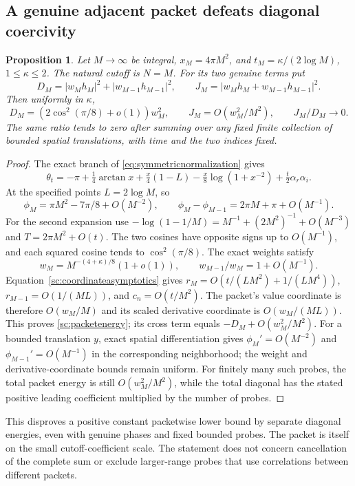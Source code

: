 \documentclass[11pt]{article}
\numberwithin{equation}{section}
\newtheorem{proposition}[theorem]{Proposition}
\theoremstyle{definition}
\theoremstyle{remark}
\begin{document}
\subsection{A genuine adjacent packet defeats diagonal coercivity}
\begin{proposition}\label{sc:packet}
Let $M\to\infty$ be integral, $x_M=4\pi M^2$, and
$t_M=\kappa/(2\log M)$, $1\le\kappa\le2$.
The natural cutoff is $N=M$. For its two genuine terms put
\[
 D_M=|w_Mh_M|^2+|w_{M-1}h_{M-1}|^2,\qquad
 J_M=|w_Mh_M+w_{M-1}h_{M-1}|^2.
\]
Then uniformly in $\kappa$,
\begin{equation}\label{sc:packetenergy}
 D_M=(2\cos^2(\pi/8)+o(1))w_M^2,\qquad
 J_M=O(w_M^2/M^2),\qquad J_M/D_M\longrightarrow0.
\end{equation}
The same ratio tends to zero after summing over any fixed finite collection
of bounded spatial translations, with time and the two indices fixed.
\end{proposition}
\begin{proof}
The exact branch of \eqref{eq:symmetricnormalization} gives
\[
 \theta_t=-\pi+\tfrac14\arctan x+\tfrac x4(1-L)
 -\tfrac x8\log(1+x^{-2})+\tfrac t2\alpha_r\alpha_i.
\]
At the specified points $L=2\log M$, so
\[
 \phi_M=\pi M^2-7\pi/8+O(M^{-2}),\qquad
 \phi_M-\phi_{M-1}=2\pi M+\pi+O(M^{-1}).
\]
For the second expansion use
$-\log(1-1/M)=M^{-1}+(2M^2)^{-1}+O(M^{-3})$ and
$T=2\pi M^2+O(t)$.
The two cosines have opposite signs up to $O(M^{-1})$, and each squared
cosine tends to $\cos^2(\pi/8)$. The exact weights satisfy
\[
 w_M=M^{-(4+\kappa)/8}(1+o(1)),\qquad
 w_{M-1}/w_M=1+O(M^{-1}).
\]
Equation~\eqref{sc:coordinateasymptotics} gives
$r_M=O(t/(LM^2)+1/(LM^4))$, $r_{M-1}=O(1/(ML))$,
and $c_n=O(t/M^2)$. The packet's value coordinate is therefore
$O(w_M/M)$ and its scaled derivative coordinate is $O(w_M/(ML))$.
This proves \eqref{sc:packetenergy}; its cross term equals
$-D_M+O(w_M^2/M^2)$.
For a bounded translation $y$, exact spatial differentiation gives
$\phi_M'=O(M^{-2})$ and $\phi_{M-1}'=O(M^{-1})$ in the corresponding
neighborhood; the weight and derivative-coordinate bounds remain uniform.
For finitely many such probes, the total packet energy is still
$O(w_M^2/M^2)$, while the total diagonal has the stated positive leading
coefficient multiplied by the number of probes.
\end{proof}
This disproves a positive constant packetwise lower bound by separate
diagonal energies, even with genuine phases and fixed bounded probes.
The packet is itself on the small cutoff-coefficient scale. The statement
does not concern cancellation of the complete sum or exclude larger-range
probes that use correlations between different packets.
\end{document}
